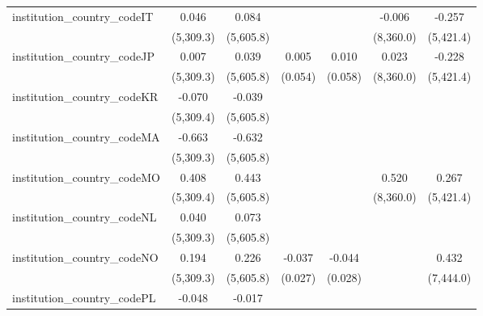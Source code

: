 \begin{tabular}{lcccccc}
   institution\_country\_codeIT          & 0.046         & 0.084         &                &                & -0.006         & -0.257\\   
                                         & (5,309.3)     & (5,605.8)     &                &                & (8,360.0)      & (5,421.4)\\   
   institution\_country\_codeJP          & 0.007         & 0.039         & 0.005          & 0.010          & 0.023          & -0.228\\   
                                         & (5,309.3)     & (5,605.8)     & (0.054)        & (0.058)        & (8,360.0)      & (5,421.4)\\   
   institution\_country\_codeKR          & -0.070        & -0.039        &                &                &                &   \\   
                                         & (5,309.4)     & (5,605.8)     &                &                &                &   \\   
   institution\_country\_codeMA          & -0.663        & -0.632        &                &                &                &   \\   
                                         & (5,309.3)     & (5,605.8)     &                &                &                &   \\   
   institution\_country\_codeMO          & 0.408         & 0.443         &                &                & 0.520          & 0.267\\   
                                         & (5,309.4)     & (5,605.8)     &                &                & (8,360.0)      & (5,421.4)\\   
   institution\_country\_codeNL          & 0.040         & 0.073         &                &                &                &   \\   
                                         & (5,309.3)     & (5,605.8)     &                &                &                &   \\   
   institution\_country\_codeNO          & 0.194         & 0.226         & -0.037         & -0.044         &                & 0.432\\   
                                         & (5,309.3)     & (5,605.8)     & (0.027)        & (0.028)        &                & (7,444.0)\\   
   institution\_country\_codePL          & -0.048        & -0.017        &                &                &                &   \\   

\end{tabular}
